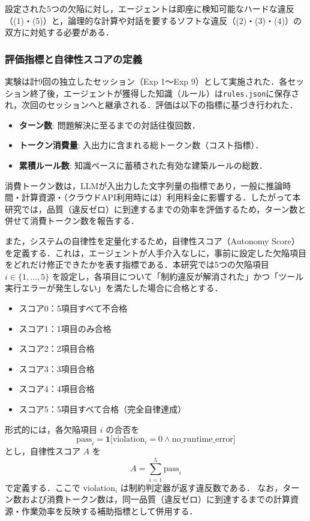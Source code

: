 \documentclass[dvipdfmx, a4paper, 9pt]{deimj}
\begin{document}
設定された5つの欠陥に対し，エージェントは即座に検知可能なハードな違反（(1)・(5)）と，論理的な計算や対話を要するソフトな違反（(2)・(3)・(4)）の双方に対処する必要がある．

\subsubsection{評価指標と自律性スコアの定義}

実験は計9回の独立したセッション（Exp 1〜Exp 9）として実施された．各セッション終了後，エージェントが獲得した知識（ルール）は\texttt{rules.json}に保存され，次回のセッションへと継承される．評価は以下の指標に基づき行われた．

\begin{itemize}
    \item \textbf{ターン数}: 問題解決に至るまでの対話往復回数．
    \item \textbf{トークン消費量}: 入出力に含まれる総トークン数（コスト指標）．
    \item \textbf{累積ルール数}: 知識ベースに蓄積された有効な建築ルールの総数．
\end{itemize}

消費トークン数は，LLMが入出力した文字列量の指標であり，一般に推論時間・計算資源・（クラウドAPI利用時には）利用料金に影響する．したがって本研究では，品質（違反ゼロ）に到達するまでの効率を評価するため，ターン数と併せて消費トークン数を報告する．

また，システムの自律性を定量化するため，自律性スコア（Autonomy Score）を定義する．これは，エージェントが人手介入なしに，事前に設定した欠陥項目をどれだけ修正できたかを表す指標である．本研究では5つの欠陥項目 $i \in \{1,\dots,5\}$ を設定し，各項目について「制約違反が解消された」かつ「ツール実行エラーが発生しない」を満たした場合に合格とする．

\begin{itemize}
    \item スコア0：5項目すべて不合格
    \item スコア1：1項目のみ合格
    \item スコア2：2項目合格
    \item スコア3：3項目合格
    \item スコア4：4項目合格
    \item スコア5：5項目すべて合格（完全自律達成）
\end{itemize}

形式的には，各欠陥項目 $i$ の合否を
\begin{equation}
\text{pass}_i = \mathbf{1}\big[\text{violation}_i = 0 \land \text{no\_runtime\_error}\big]
\end{equation}
とし，自律性スコア $A$ を
\begin{equation}
A = \sum_{i=1}^{5}\text{pass}_i
\end{equation}
で定義する．ここで $\text{violation}_i$ は制約判定器が返す違反数である．
なお，ターン数および消費トークン数は，同一品質（違反ゼロ）に到達するまでの計算資源・作業効率を反映する補助指標として併用する．
\end{document}
